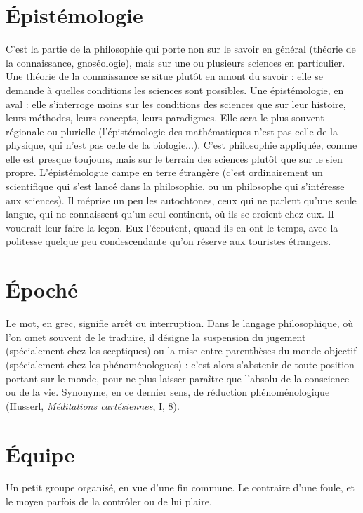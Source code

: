 \section{Épistémologie}
C’est la partie de la philosophie qui porte non sur le
savoir en général (théorie de la connaissance, gnoséologie),
mais sur une ou plusieurs sciences en particulier. Une théorie de la
connaissance se situe plutôt en amont du savoir : elle se demande à quelles
conditions les sciences sont possibles. Une épistémologie, en aval : elle s’interroge
moins sur les conditions des sciences que sur leur histoire, leurs méthodes,
leurs concepts, leurs paradigmes. Elle sera le plus souvent régionale ou plurielle
(l’épistémologie des mathématiques n’est pas celle de la physique, qui n’est pas
celle de la biologie...). C’est philosophie appliquée, comme elle est presque
toujours, mais sur le terrain des sciences plutôt que sur le sien propre. L’épistémologue
campe en terre étrangère (c’est ordinairement un scientifique qui s’est
lancé dans la philosophie, ou un philosophe qui s'intéresse aux sciences). Il
méprise un peu les autochtones, ceux qui ne parlent qu’une seule langue, qui
ne connaissent qu’un seul continent, où ils se croient chez eux. Il voudrait leur
faire la leçon. Eux l’écoutent, quand ils en ont le temps, avec la politesse
quelque peu condescendante qu’on réserve aux touristes étrangers.

\section{Époché}
Le mot, en grec, signifie arrêt ou interruption. Dans le langage
philosophique, où l’on omet souvent de le traduire, il désigne la
suspension du jugement (spécialement chez les sceptiques) ou la mise entre
parenthèses du monde objectif (spécialement chez les phénoménologues) : c’est
alors s'abstenir de toute position portant sur le monde, pour ne plus laisser
paraître que l’absolu de la conscience ou de la vie. Synonyme, en ce dernier
sens, de réduction phénoménologique (Husserl, {\it Méditations cartésiennes}, I, 8).

\section{Équipe}
Un petit groupe organisé, en vue d’une fin commune. Le contraire
d’une foule, et le moyen parfois de la contrôler ou de lui plaire.

